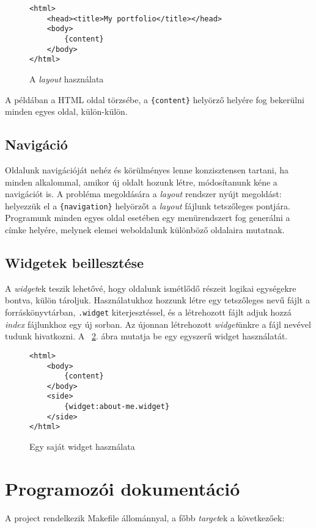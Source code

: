 \documentclass[a4paper,10pt]{article}
\begin{document}
\begin{figure}[h]
	\begin{center}
		\begin{lstlisting}
<html>
	<head><title>My portfolio</title></head>
	<body>
		{content}
	</body>
</html>
		\end{lstlisting}
		\caption{A \emph{layout} használata}
		\label{fig:layout}
	\end{center}
\end{figure}

A példában a HTML oldal törzsébe, a \texttt{\{content\}} helyörző helyére fog bekerülni minden egyes oldal, külön-külön.

\subsection{Navigáció}
Oldalunk navigációját nehéz és körülményes lenne konzisztensen tartani, ha minden alkalommal, amikor új oldalt hozunk létre, módosítanunk kéne a navigációt is. A probléma megoldására a \emph{layout} rendszer nyújt megoldást: helyezzük el a \texttt{\{navigation\}} helyörzőt a \emph{layout} fájlunk tetszőleges pontjára. Programunk minden egyes oldal esetében egy menürendszert fog generálni a címke helyére, melynek elemei weboldalunk különböző oldalaira mutatnak.

\subsection{Widgetek beillesztése}
A \emph{widget}ek teszik lehetővé, hogy oldalunk ismétlődő részeit logikai egységekre bontva, külön tároljuk. Használatukhoz hozzunk létre egy tetszőleges nevű fájlt a forráskönyvtárban, \texttt{.widget} kiterjesztéssel, és a létrehozott fájlt adjuk hozzá \emph{index} fájlunkhoz egy új sorban. Az újonnan létrehozott \emph{widget}ünkre a fájl nevével tudunk hivatkozni. A ~\ref{fig:widget}. ábra mutatja be egy egyszerű widget használatát.

\begin{figure}[h!]
	\begin{center}
		\begin{lstlisting}
<html>
	<body>
		{content}
	</body>
	<side>
		{widget:about-me.widget}
	</side>
</html>
		\end{lstlisting}
		\caption{Egy saját widget használata}
		\label{fig:widget}
	\end{center}
\end{figure}


\section{Programozói dokumentáció}
A project rendelkezik Makefile állománnyal, a főbb \emph{target}ek a következőek:
\end{document}
